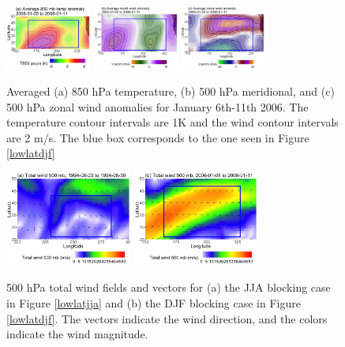 \documentclass[smallextended]{svjour3}       %
\numberwithin{equation}{section}
\begin{document}
\begin{figure}
\centering
\includegraphics[width=0.25\textwidth]{fig17a}
\includegraphics[width=0.25\textwidth]{fig17b}
\includegraphics[width=0.25\textwidth]{fig17c}
\caption{Averaged (a) 850 hPa temperature, (b) 500 hPa meridional, and (c) 500 hPa zonal wind anomalies for January 6th-11th 2006. The temperature contour intervals are 1K and the wind contour intervals are 2 m/s. The blue box corresponds to the one seen in Figure \ref{lowlatdjf}}\label{avgdjf}  
\end{figure}

\begin{figure}
\centering
\includegraphics[width=0.37\textwidth]{fig18a}
\includegraphics[width=0.37\textwidth]{fig18b}
\caption{500 hPa total wind fields and vectors for (a) the JJA blocking case in Figure \ref{lowlatjja} and (b) the DJF blocking case in Figure \ref{lowlatdjf}. The vectors indicate the wind direction, and the colors indicate the wind magnitude.}\label{totwind}
\end{figure}
\end{document}
